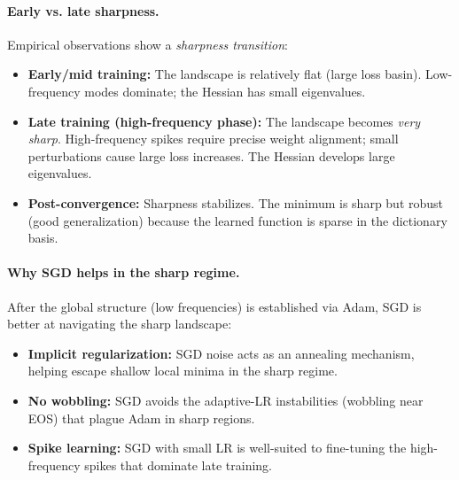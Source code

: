 \documentclass{article}
\begin{document}
\paragraph{Early vs. late sharpness.}
Empirical observations show a \emph{sharpness transition}:
\begin{itemize}
    \item \textbf{Early/mid training:} The landscape is relatively flat (large loss basin). Low-frequency modes dominate; the Hessian has small eigenvalues.
    \item \textbf{Late training (high-frequency phase):} The landscape becomes \emph{very sharp}. High-frequency spikes require precise weight alignment; small perturbations cause large loss increases. The Hessian develops large eigenvalues.
    \item \textbf{Post-convergence:} Sharpness stabilizes. The minimum is sharp but robust (good generalization) because the learned function is sparse in the dictionary basis.
\end{itemize}

\paragraph{Why SGD helps in the sharp regime.}
After the global structure (low frequencies) is established via Adam, SGD is better at navigating the sharp landscape:
\begin{itemize}
    \item \textbf{Implicit regularization:} SGD noise acts as an annealing mechanism, helping escape shallow local minima in the sharp regime.
    \item \textbf{No wobbling:} SGD avoids the adaptive-LR instabilities (wobbling near EOS) that plague Adam in sharp regions.
    \item \textbf{Spike learning:} SGD with small LR is well-suited to fine-tuning the high-frequency spikes that dominate late training.
\end{itemize}

\vspace{1em}
\end{document}

